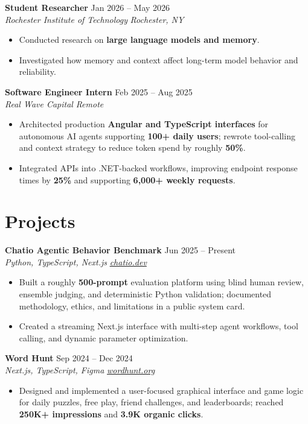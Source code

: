\documentclass[10pt,letterpaper]{article}
\newif\ifresumeFirstRole
\newcommand{\resumeRole}[4]{%
  \ifresumeFirstRole
    \global\resumeFirstRolefalse
  \else
    \vspace{0pt plus 1fill}%
  \fi
  \textbf{#1} \hfill #2\\
  \textit{#3} \hfill \textit{#4}
}
\begin{document}
\resumeRole{Student Researcher}{Jan 2026 -- May 2026}{Rochester Institute of Technology}{Rochester, NY}
\begin{itemize}
  \item Conducted research on \textbf{large language models and memory}.
  \item Investigated how memory and context affect long-term model behavior and reliability.
\end{itemize}

\resumeRole{Software Engineer Intern}{Feb 2025 -- Aug 2025}{Real Wave Capital}{Remote}
\begin{itemize}
  \item Architected production \textbf{Angular and TypeScript interfaces} for autonomous AI agents supporting \textbf{100+ daily users}; rewrote tool-calling and context strategy to reduce token spend by roughly \textbf{50\%}.
  \item Integrated APIs into .NET-backed workflows, improving endpoint response times by \textbf{25\%} and supporting \textbf{6,000+ weekly requests}.
\end{itemize}

\section*{Projects}
\resumeRole{Chatio Agentic Behavior Benchmark}{Jun 2025 -- Present}{Python, TypeScript, Next.js}{\href{https://chatio.dev}{chatio.dev}}
\begin{itemize}
  \item Built a roughly \textbf{500-prompt} evaluation platform using blind human review, ensemble judging, and deterministic Python validation; documented methodology, ethics, and limitations in a public system card.
  \item Created a streaming Next.js interface with multi-step agent workflows, tool calling, and dynamic parameter optimization.
\end{itemize}

\resumeRole{Word Hunt}{Sep 2024 -- Dec 2024}{Next.js, TypeScript, Figma}{\href{https://wordhunt.org}{wordhunt.org}}
\begin{itemize}
  \item Designed and implemented a user-focused graphical interface and game logic for daily puzzles, free play, friend challenges, and leaderboards; reached \textbf{250K+ impressions} and \textbf{3.9K organic clicks}.
\end{itemize}
\end{document}
